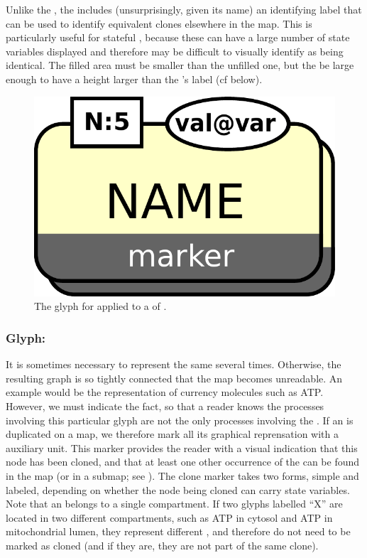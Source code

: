 Unlike the , the  includes (unsurprisingly, given its name) an identifying label that can be used to identify equivalent clones elsewhere in the map.  This is particularly useful for stateful , because these can have a large number of state variables displayed and therefore may be difficult to visually identify as being identical. The filled area must be smaller than the unfilled one, but the be large enough to have a height larger than the 's label (cf below).

\begin{figure}[H]
  \centering
  \includegraphics[scale = 0.3]{le_images/labeledCloneMarker}
  \caption{The \PD glyph for  applied to a  of  .}
  \label{fig:labeledCloneMarker}
\end{figure}


\subsubsection{Glyph: }
\label{sec:cloneMarker}

It is sometimes necessary to represent the same  several times. Otherwise, the resulting graph is so tightly connected that the map becomes unreadable. An example would be the representation of currency molecules such as ATP. However, we must indicate the fact, so that a reader knows the processes involving this particular glyph are not the only processes involving the . If an  is duplicated on a map, we therefore mark all its graphical reprensation with a  auxiliary unit.  This marker provides the reader with a visual indication that this node has been cloned, and that at least one other occurrence of the  can be found in the map (or in a submap; see ).  The clone marker takes two forms, simple and labeled, depending on whether the node being cloned can carry state variables. Note that an  belongs to a single compartment. If two glyphs labelled ``X'' are located in two different compartments, such as ATP in cytosol and ATP in mitochondrial lumen, they represent different , and therefore do not need to be marked as cloned (and if they are, they are not part of the same clone).

